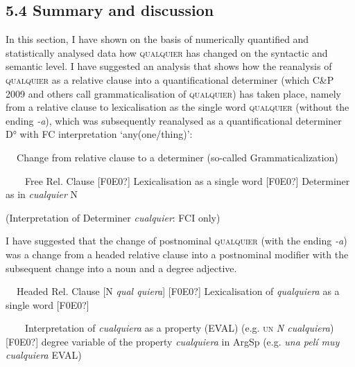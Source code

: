 \subsection[5.4 Summary and discussion]{\textbf{5.4 Summary and discussion}}
\begin{styleStandard}
In this section, I have shown on the basis of numerically quantified and statistically analysed data how \textsc{qualquier} has changed on the syntactic and semantic level. I have suggested an analysis that shows how the reanalysis of \textsc{qualquier} as a relative clause into a quantificational determiner (which C\&P 2009 and others call grammaticalisation of \textsc{qualquier}) has taken place, namely from a relative clause to lexicalisation as the single word \textsc{qualquier }(without the ending \textit{{}-a}), which was subsequently reanalysed as a quantificational determiner D° with FC interpretation ‘any(one/thing)’:
\end{styleStandard}

\begin{styleStandard}
\textbf{\ \ }Change from relative clause to a determiner (so-called Grammaticalization)
\end{styleStandard}

\begin{styleStandard}
\ \ \ \ Free Rel. Clause [F0E0?] Lexicalisation as a single word [F0E0?] Determiner as in \textit{cualquier} N
\end{styleStandard}

\begin{styleStandard}
(Interpretation of Determiner \textit{cualquier}: FCI only)
\end{styleStandard}

\begin{styleStandard}
I have suggested that the change of postnominal \textsc{qualquier}\textit{ }(with the ending \textit{{}-a}) was a change from a headed relative clause into a postnominal modifier with the subsequent change into a noun and a degree adjective.
\end{styleStandard}

\begin{styleStandard}
\textbf{\ \ }Headed Rel. Clause [N \textit{qual quiera}] [F0E0?] Lexicalisation of \textit{qualquiera} as a single word [F0E0?]
\end{styleStandard}

\begin{styleStandard}
\ \ \ \ Interpretation of \textit{cualquiera} as a property (EVAL) (e.g. \textsc{un}\textit{ N cualquiera}) [F0E0?] degree variable of the property \textit{cualquiera} in ArgSp (e.g. \textit{una pelí muy cualquiera} EVAL)
\end{styleStandard}


